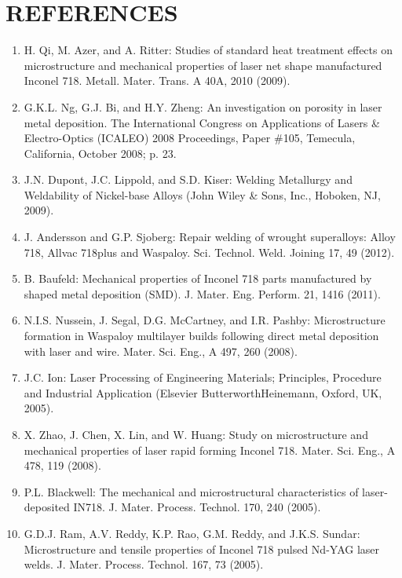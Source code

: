 \documentclass[10pt]{article}
\begin{document}
\section*{REFERENCES}
\begin{enumerate}
  \item H. Qi, M. Azer, and A. Ritter: Studies of standard heat treatment effects on microstructure and mechanical properties of laser net shape manufactured Inconel 718. Metall. Mater. Trans. A 40A, 2010 (2009).

  \item G.K.L. Ng, G.J. Bi, and H.Y. Zheng: An investigation on porosity in laser metal deposition. The International Congress on Applications of Lasers \& Electro-Optics (ICALEO) 2008 Proceedings, Paper \#105, Temecula, California, October 2008; p. 23.

  \item J.N. Dupont, J.C. Lippold, and S.D. Kiser: Welding Metallurgy and Weldability of Nickel-base Alloys (John Wiley \& Sons, Inc., Hoboken, NJ, 2009).

  \item J. Andersson and G.P. Sjoberg: Repair welding of wrought superalloys: Alloy 718, Allvac 718plus and Waspaloy. Sci. Technol. Weld. Joining 17, 49 (2012).

  \item B. Baufeld: Mechanical properties of Inconel 718 parts manufactured by shaped metal deposition (SMD). J. Mater. Eng. Perform. 21, 1416 (2011).

  \item N.I.S. Nussein, J. Segal, D.G. McCartney, and I.R. Pashby: Microstructure formation in Waspaloy multilayer builds following direct metal deposition with laser and wire. Mater. Sci. Eng., A 497, 260 (2008).

  \item J.C. Ion: Laser Processing of Engineering Materials; Principles, Procedure and Industrial Application (Elsevier ButterworthHeinemann, Oxford, UK, 2005).

  \item X. Zhao, J. Chen, X. Lin, and W. Huang: Study on microstructure and mechanical properties of laser rapid forming Inconel 718. Mater. Sci. Eng., A 478, 119 (2008).

  \item P.L. Blackwell: The mechanical and microstructural characteristics of laser-deposited IN718. J. Mater. Process. Technol. 170, 240 (2005).

  \item G.D.J. Ram, A.V. Reddy, K.P. Rao, G.M. Reddy, and J.K.S. Sundar: Microstructure and tensile properties of Inconel 718 pulsed Nd-YAG laser welds. J. Mater. Process. Technol. 167, 73 (2005).


\end{enumerate}
\end{document}
